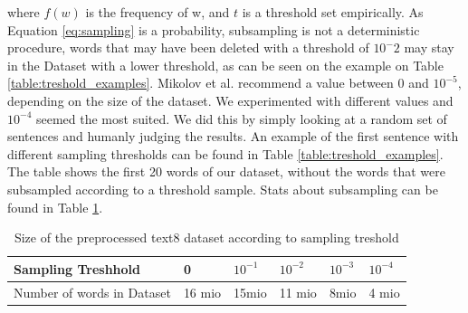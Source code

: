 where $f(w)$ is the frequency of w, and $t$ is a threshold set empirically. As Equation \ref{eq:sampling} is a probability, subsampling is not a deterministic procedure, words that may have been deleted with a threshold of $10^-2$ may stay in the Dataset with a lower threshold, as can be seen on the example on Table \ref{table:treshold_examples}. Mikolov et al. recommend a value between $0$ and $10^{-5}$, depending on the size of the dataset. We experimented with different values and $10^{-4}$ seemed the most suited. We did this by simply looking at a random set of sentences and humanly judging the results. An example of the first sentence with different sampling thresholds can be found in Table \ref{table:treshold_examples}. The table shows the first 20 words of our dataset, without the words that were subsampled according to a threshold sample. Stats about subsampling can be found in Table \ref{table:treshold}. 
\begin{table}[h]
\centering
\begin{tabular}{|l|l|l|l|l|l|}
\hline
Sampling Treshhold &  0      &      $ 10^{-1}$&$   10^{-2}$& $10^{-3}     $ &$10^{-4}   $    \\ \hline
Number of words in Dataset    & 16 mio & 15mio & 11 mio & 8mio & 4 mio \\ \hline
\end{tabular}
\caption{Size of the preprocessed text8 dataset according to sampling treshold}
\label{table:treshold}
\end{table}


